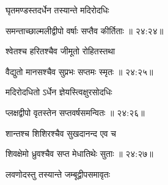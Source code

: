 {\devanagarifont घृतमण्डस्तदर्धेन तस्यान्ते मदिरोदधिः \thinspace{\dandab} \dontdisplaylinenum }%


{\devanagarifont समन्ताच्छाल्मलीद्वीपो वर्षाः सप्तैव कीर्तिताः {॥ २४:२४॥} \veg\dontdisplaylinenum }%

{\devanagarifont श्वेतश्च हरितश्चैव जीमूतो रोहितस्तथा \thinspace{\dandab} \dontdisplaylinenum }%


{\devanagarifont वैद्युतो मानसश्चैव सुप्रभः सप्तमः स्मृतः {॥ २४:२५॥} \veg\dontdisplaylinenum }%

{\devanagarifont मदिरोदधितो ऽर्धेन ज्ञेयस्त्विक्षुरसोदधिः \thinspace{\dandab} \dontdisplaylinenum }%


{\devanagarifont प्लक्षद्वीपो वृतस्तेन सप्तवर्षसमन्वितः {॥ २४:२६॥} \veg\dontdisplaylinenum }%
 
{\devanagarifont शान्तश्च शिशिरश्चैव सुखदानन्द एव च \thinspace{\dandab} \dontdisplaylinenum }%


{\devanagarifont शिवक्षेमो ध्रुवश्चैव सप्त मेधातिथेः सुताः {॥ २४:२७॥} \veg\dontdisplaylinenum }%

{\devanagarifont लवणोदस्तु तस्यान्ते जम्बूद्वीपसमावृतः \thinspace{\dandab} \dontdisplaylinenum }%

